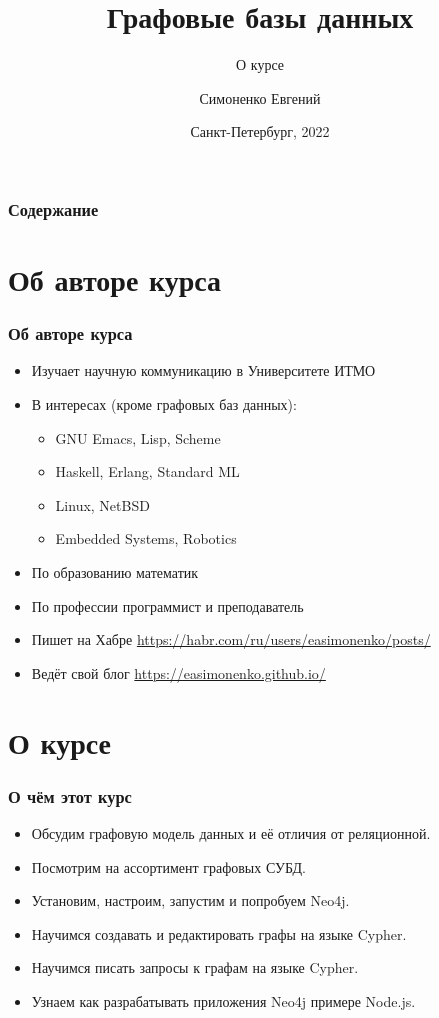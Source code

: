 \documentclass[11pt]{beamer}
\title[Графовые СУБД]{Графовые базы данных}
\subtitle{О курсе}
\author[]{Симоненко Евгений}
\institute[]{Университет ИТМО}
\date[]{Санкт-Петербург, 2022}
\begin{document}
\begin{frame}
  \titlepage
\end{frame}

\begin{frame}
  \frametitle{Содержание}
  \tableofcontents
\end{frame}

\section{Об авторе курса}

\begin{frame}
  \frametitle{Об авторе курса}
  \begin{itemize}
  \item Изучает научную коммуникацию в Университете ИТМО
  \item В интересах (кроме графовых баз данных):
    \begin{itemize}
    \item GNU Emacs, Lisp, Scheme
    \item Haskell, Erlang, Standard ML
    \item Linux, NetBSD
    \item Embedded Systems, Robotics
    \end{itemize}
  \item По образованию математик
  \item По профессии программист и преподаватель
  \item Пишет на Хабре \url{https://habr.com/ru/users/easimonenko/posts/}
  \item Ведёт свой блог \url{https://easimonenko.github.io/}
  \end{itemize}
\end{frame}

\section{О курсе}

\begin{frame}
  \frametitle{О чём этот курс}
  \begin{itemize}
  \item Обсудим графовую модель данных и её отличия от реляционной.
  \item Посмотрим на ассортимент графовых СУБД.
  \item Установим, настроим, запустим и попробуем Neo4j.
  \item Научимся создавать и редактировать графы на языке Cypher.
  \item Научимся писать запросы к графам на языке Cypher.
  \item Узнаем как разрабатывать приложения Neo4j примере Node.js.
  \end{itemize}
\end{frame}
\end{document}
